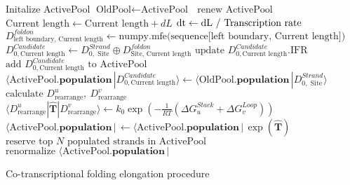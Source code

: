\documentclass[11pt, a4paper]{article}
\begin{document}
\begin{algorithm}
  \begin{algorithmic}[1]
    \State Initalize ActivePool
      \State $\text{OldPool} \gets \text{ActivePool }$
      \State $\text{renew ActivePool }$
      \State $\text{Current length} \gets \text{Current length} + dL$
      \State $\text{dt} \gets \text{dL / \text{Transcription rate}}$
        \State $D^{foldon}_{\text{left boundary}, \text{ Current length}} \gets \text{numpy.mfe(sequence[left boundary, Current length]})$
      \EndFor
          \State $D^{Candidate}_{0,\text{Current length}} \gets D^{Strand}_{0, \text{ Site}} \oplus D^{foldon}_{\text{Site}, \text{ Current length}}$
            \State $\text{update $D^{Candidate}_{0,\text{Current length}}$.IFR}$
          \Else
            \State $\text{add $D^{Candidate}_{0,\text{Current length}}$ to ActivePool}$
          \EndIf
            \State $\langle \text{ActivePool}.\textbf{population}\,|D^{Candidate}_{0,\text{Current length}}\rangle \gets \langle \text{OldPool}.\textbf{population}\,|D^{Strand}_{0, \text{ Site}}\rangle$
          \EndIf
        \EndFor
      \EndFor
        \State $\text{calculate  } D^{u}_{\text{rearrange}} ,\ D^{v}_{\text{rearrange}}$
        \State $\langle D^{u}_{\text{rearrange}} | \hat{\mathbf{T}} |D^{v}_{\text{rearrange}} \rangle \gets k_0 \exp(-\frac{1}{RT}(\Delta G^{Stack}_{u}+\Delta G^{Loop}_{v}) )$
      \EndFor
      \State $\langle \text{ActivePool}.\textbf{population}\,|\, \gets \langle \text{ActivePool}.\textbf{population}\,|\, \exp(\hat{\mathbf{T}}) $
      \State $\text{reserve top $N$ populated strands in ActivePool}$
      \State $\text{renormalize }\langle \text{ActivePool}.\textbf{population}\,|$
    \EndWhile
  \end{algorithmic}
\caption{Co-transcriptional folding elongation procedure}\label{algorithm:1}
\end{algorithm}
\end{document}

